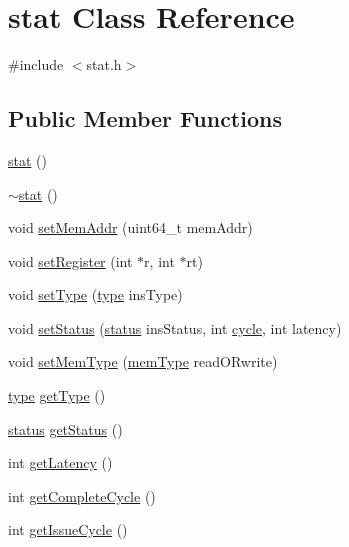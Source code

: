 \hypertarget{classstat}{
\section{stat Class Reference}
\label{classstat}
}


{\ttfamily \#include $<$stat.h$>$}

\subsection*{Public Member Functions}
\begin{DoxyCompactItemize}
\item 
\hyperlink{classstat_ab89727a4198ffd032e194917596e156b}{stat} ()
\item 
\hyperlink{classstat_adb268824871b2f69d7b11003abf2fe6b}{$\sim$stat} ()
\item 
void \hyperlink{classstat_acaa589d5c6e90c0d7fe55ea5a80c39cd}{setMemAddr} (uint64\_\-t memAddr)
\item 
void \hyperlink{classstat_a534c0aacb73143316373470a70aece20}{setRegister} (int $\ast$r, int $\ast$rt)
\item 
void \hyperlink{classstat_aac993b5bfa99506a46b3bd02382613ed}{setType} (\hyperlink{binaryTranslator_2global_8h_a7aead736a07eaf25623ad7bfa1f0ee2d}{type} insType)
\item 
void \hyperlink{classstat_ac78f327016771d7189a0dd9e7709d7ce}{setStatus} (\hyperlink{global_2global_8h_a015eb90e0de9f16e87bd149d4b9ce959}{status} insStatus, int \hyperlink{vliwScheduler_8cpp_a1f4871d45089b039d95d3832dd123827}{cycle}, int latency)
\item 
void \hyperlink{classstat_ae3663029f693d0bd7279007a96b61fd1}{setMemType} (\hyperlink{binaryTranslator_2global_8h_a94b8423a23b95a7adac22848b81e7c0c}{memType} readORwrite)
\item 
\hyperlink{binaryTranslator_2global_8h_a7aead736a07eaf25623ad7bfa1f0ee2d}{type} \hyperlink{classstat_ad6c243f8915182cc7f3af301714cf6b2}{getType} ()
\item 
\hyperlink{global_2global_8h_a015eb90e0de9f16e87bd149d4b9ce959}{status} \hyperlink{classstat_af85423f8423fc110dc995e0da6d56f58}{getStatus} ()
\item 
int \hyperlink{classstat_a404f63a716c9853ebe824b2103ac6dbb}{getLatency} ()
\item 
int \hyperlink{classstat_adac51f4d495bd7bbfccd1f5c616a2a83}{getCompleteCycle} ()
\item 
int \hyperlink{classstat_aca46365b8adad2b91b5626f51e85e22a}{getIssueCycle} ()

\end{DoxyCompactItemize}
